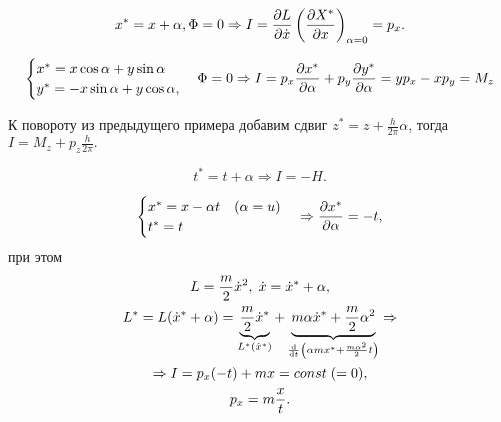\begin{ex}
\begin{equation}
x^* = x + \alpha, \Phi = 0 \Rightarrow I = \pdv{L}{\dot{x}} \left(\pdv{X^*}{x}\right)_{\alpha = 0} = p_x.
\end{equation}
\end{ex}
\begin{ex}[Поворот]
\begin{equation}
\begin{cases}
x^* = x \cos \alpha + y \sin \alpha\\
y^* = -x\sin \alpha + y \cos \alpha,
\end{cases}
\Phi = 0 \Rightarrow I = p_x \pdv{x^*}{\alpha} + p_y \pdv{y^*}{\alpha} = yp_x - xp_y = M_z
\end{equation}
\end{ex}
\begin{ex}
К повороту из предыдущего примера добавим сдвиг $z^* = z + \frac{h}{2\pi} \alpha$, тогда
$I = M_z + p_z \frac{h}{2\pi}.$
\end{ex}
\begin{ex}
\[t^* = t + \alpha \Rightarrow I = -H.\]
\end{ex}
\begin{ex}
\begin{equation}
\begin{cases}
x^* = x - \alpha t \quad(\alpha = u)\\
t^* = t
\end{cases}
\Rightarrow \pdv{x^*}{\alpha} = -t,
\end{equation}
при этом 
\begin{gather}
L = \frac{m}{2} \dot{x}^2,\; \dot{x} = \dot{x}^* + \alpha,\\
L^* = L(\dot{x}^* + \alpha) = \underbrace{\frac{m}{2} \dot{x}^*}_{L^*(\dot{x}^*)} + \underbrace{m \alpha \dot{x}^* + \frac{m}{2} \alpha^2}_{\dv{t}\left(\alpha mx^* + \frac{m\alpha^2}{2}t\right)} \Rightarrow\\
\Rightarrow I = p_x (-t) + mx = const\; (= 0),\\
p_x = m \frac{x}{t}.
\end{gather}

\end{ex}



